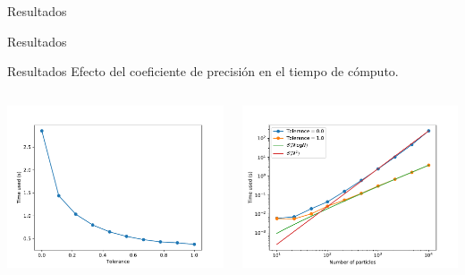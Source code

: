 \documentclass{beamer}
\begin{document}
\begin{frame}{Resultados}
	\centering
	\\
\end{frame}
\begin{frame}{Resultados}
	\centering
	\\
\end{frame}
\begin{frame}{Resultados}
	Efecto del coeficiente de precisi\'on en el tiempo de c\'omputo.
	\begin{columns}
		\begin{column}{0.5\textwidth}
			\includegraphics[width=\linewidth]{sources/images/Tolerance_results.pdf}
		\end{column}
		\begin{column}{0.5\textwidth}
			\includegraphics[width=\linewidth]{sources/images/Particles_results.pdf}
		\end{column}
	\end{columns}
\end{frame}
\end{document}
